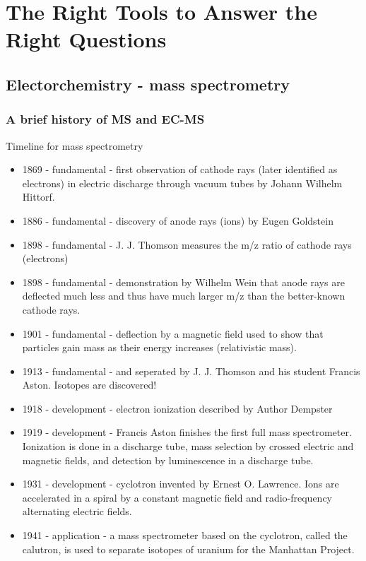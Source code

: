 

\chapter{The Right Tools to Answer the Right Questions}

\section{Electorchemistry - mass spectrometry}

\subsection{A brief history of MS and EC-MS}
Timeline for mass spectrometry

\begin{itemize}
	\item 1869 - fundamental - first observation of cathode rays (later identified as electrons) in electric discharge through vacuum tubes by Johann Wilhelm Hittorf.
	\item 1886 - fundamental - discovery of anode rays (ions) by Eugen Goldstein
	\item 1898 - fundamental - J. J. Thomson measures the m/z ratio of cathode rays (electrons)
	\item 1898 - fundamental - demonstration by Wilhelm Wein that anode rays are deflected much less and thus have much larger m/z than the better-known cathode rays.
	\item 1901 - fundamental - deflection by a magnetic field used to show that particles gain mass as their energy increases (relativistic mass).
	\item 1913 - fundamental -  and  seperated by J. J. Thomson and his student Francis Aston. Isotopes are discovered!
	\item 1918 - development - electron ionization described by Author Dempster
	\item 1919 - development - Francis Aston finishes the first full mass spectrometer. Ionization is done in a discharge tube, mass selection by crossed electric and magnetic fields, and detection by luminescence in a discharge tube.
	\item 1931 - development - cyclotron invented by Ernest O. Lawrence. Ions are accelerated in a spiral by a constant magnetic field and radio-frequency alternating electric fields.
	\item 1941 - application - a mass spectrometer based on the cyclotron, called the calutron, is used to separate isotopes of uranium for the Manhattan Project.

\end{itemize}

